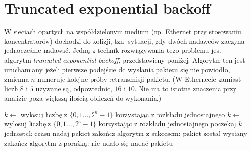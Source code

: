 \documentclass[twoside]{mwart}
\begin{document}
\clearpage


\section{Truncated exponential backoff}
W sieciach opartych na współdzielonym medium (np. Ethernet przy stosowaniu koncentratorów) dochodzi do kolizji, tzn. sytuacji, gdy dwóch nadawców zaczyna jednocześnie nadawać.
Jedną z technik rozwiązywania tego problemu jest algorytm \emph{truncated exponential backoff}, przedstawiony poniżej.
Algorytm ten jest uruchamiany jeżeli pierwsze podejście do wysłania pakietu się nie powiodło, zmienna $n$ numeruje kolejne próby retransmisji pakietu.
(W Ethernecie zamiast liczb $8$ i $5$ używane są, odpowiednio, $16$ i $10$.
Nie ma to istotne znaczenia przy analizie poza większą ilością obliczeń do wykonania.)
\begin{algorithm}
{
	{
		$k \gets $ wylosuj liczbę z $\{0, 1 \ldots, 2^n-1\}$ korzystając z rozkładu jednostajnego \label{backoff:delay1}
	}
	\lElse
	{
		$k \gets $ wylosuj liczbę z $\{0, 1 \ldots, 2^5-1\}$  korzystając z rozkładu jednostajnego \label{backoff:delay2}
	}
	poczekaj $k$ jednostek czasu \label{backoff:wait}\;
	nadaj pakiet \;
	{
		zakończ algorytm z sukcesem: pakiet został wysłany
	}
}
zakończ algorytm z porażką: nie udało się nadać pakietu
\end{algorithm}
\end{document}
